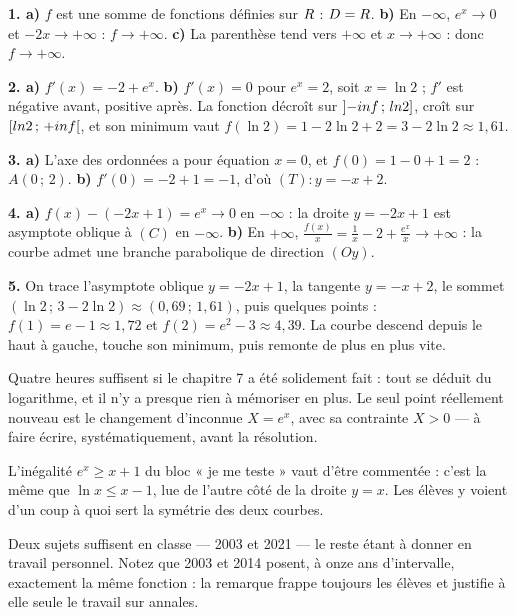 \begin{corrige}
\textbf{1. a)} $f$ est une somme de fonctions définies sur $R$ :
$D = R$.
\textbf{b)} En $-\infty$, $e^{x} \to 0$ et $-2x \to +\infty$ :
$f \to +\infty$.
\textbf{c)} La parenthèse tend vers $+\infty$ et $x \to +\infty$ : donc
$f \to +\infty$.

\textbf{2. a)} $f'(x) = -2+e^{x}$.
\textbf{b)} $f'(x) = 0$ pour $e^{x} = 2$, soit $x = \ln2$ ; $f'$ est
négative avant, positive après. La fonction décroît sur
$\left]-inf\,;\,ln2\right]$, croît sur $\left[ln2\,;\,+inf\right[$, et
son minimum vaut $f(\ln2) = 1-2\ln2+2 = 3-2\ln2 \approx 1{,}61$.

\textbf{3. a)} L'axe des ordonnées a pour équation $x = 0$, et
$f(0) = 1-0+1 = 2$ : $A(0\,;\,2)$.
\textbf{b)} $f'(0) = -2+1 = -1$, d'où $(T) : y = -x+2$.

\textbf{4. a)} $f(x)-(-2x+1) = e^{x} \to 0$ en $-\infty$ : la droite
$y = -2x+1$ est asymptote oblique à $(C)$ en $-\infty$.
\textbf{b)} En $+\infty$, $\frac{f(x)}{x} = \frac1x-2+\frac{e^{x}}{x} \to
+\infty$ : la courbe admet une branche parabolique de direction $(Oy)$.

\textbf{5.} On trace l'asymptote oblique $y = -2x+1$, la tangente
$y = -x+2$, le sommet $\left(\ln2\,;\,3-2\ln2\right) \approx
(0{,}69\,;\,1{,}61)$, puis quelques points : $f(1) = e-1 \approx 1{,}72$ et
$f(2) = e^{2}-3 \approx 4{,}39$. La courbe descend depuis le haut à gauche,
touche son minimum, puis remonte de plus en plus vite.
\end{corrige}

\begin{notepourlaclasse}
Quatre heures suffisent si le chapitre 7 a été solidement fait : tout se
déduit du logarithme, et il n'y a presque rien à mémoriser en plus. Le seul
point réellement nouveau est le changement d'inconnue $X = e^{x}$, avec sa
contrainte $X>0$ — à faire écrire, systématiquement, avant la résolution.

L'inégalité $e^{x} \geq x+1$ du bloc « je me teste » vaut d'être commentée :
c'est la même que $\ln x \leq x-1$, lue de l'autre côté de la droite
$y = x$. Les élèves y voient d'un coup à quoi sert la symétrie des deux
courbes.

Deux sujets suffisent en classe — 2003 et 2021 — le reste étant à donner en
travail personnel. Notez que 2003 et 2014 posent, à onze ans d'intervalle,
exactement la même fonction : la remarque frappe toujours les élèves et
justifie à elle seule le travail sur annales.
\end{notepourlaclasse}

